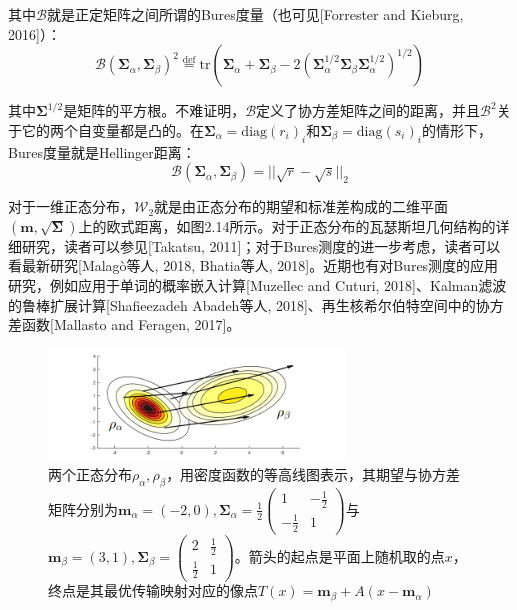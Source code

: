 \documentclass[cn,10pt,math=newtx,citestyle=gb7714-2015,bibstyle=gb7714-2015]{elegantbook}
\begin{document}
\begin{postulate}[正态分布的距离]
其中$\mathcal{B}$就是正定矩阵之间所谓的Bures度量（也可见[Forrester and Kieburg, 2016]）：
\begin{equation}
    \label{2.42}
    \mathcal{B}(\mathbf{\Sigma}_\alpha,\mathbf{\Sigma}_\beta)^2 \overset{\text{def}}{=} \text{tr} \left( \mathbf{\Sigma}_\alpha + \mathbf{\Sigma}_\beta - 2(\mathbf{\Sigma}_\alpha^{1/2}\mathbf{\Sigma}_\beta\mathbf{\Sigma}_\alpha^{1/2})^{1/2} \right)
\end{equation}

其中$\mathbf{\Sigma}^{1/2}$是矩阵的平方根。不难证明，$\mathcal{B}$定义了协方差矩阵之间的距离，并且$\mathcal{B}^2$关于它的两个自变量都是凸的。在$\mathbf{\Sigma}_\alpha=\text{diag}(r_i)_i$和$\mathbf{\Sigma}_\beta=\text{diag}(s_i)_i$的情形下，Bures度量就是Hellinger距离：
\begin{equation*}
    \mathcal{B}(\mathbf{\Sigma}_\alpha,\mathbf{\Sigma}_\beta)=||\sqrt{r}-\sqrt{s}||_2
\end{equation*}

对于一维正态分布，$\mathcal{W}_2$就是由正态分布的期望和标准差构成的二维平面$(\mathbf{m},\sqrt{\mathbf{\Sigma}})$上的欧式距离，如图2.14所示。对于正态分布的瓦瑟斯坦几何结构的详细研究，读者可以参见[Takatsu, 2011]；对于Bures测度的进一步考虑，读者可以看最新研究[Malag\`o等人, 2018, Bhatia等人, 2018]。近期也有对Bures测度的应用研究，例如应用于单词的概率嵌入计算[Muzellec and Cuturi, 2018]、Kalman滤波的鲁棒扩展计算[Shafieezadeh Abadeh等人, 2018]、再生核希尔伯特空间中的协方差函数[Mallasto and Feragen, 2017]。
\end{postulate}

\begin{figure}[H]
    \centering
    \includegraphics[width=0.7\textwidth]{figure/fig2.12.png}
    \caption{两个正态分布$\rho_\alpha,\rho_\beta$，用密度函数的等高线图表示，其期望与协方差矩阵分别为$\mathbf{m}_\alpha=(-2,0),\mathbf{\Sigma}_\alpha=\frac{1}{2}\begin{pmatrix}1 & -\frac{1}{2}\\-\frac{1}{2} & 1\end{pmatrix}$与$\mathbf{m}_\beta=(3,1),\mathbf{\Sigma}_\beta=\begin{pmatrix}2 & \frac{1}{2}\\\frac{1}{2} & 1\end{pmatrix}$。箭头的起点是平面上随机取的点$x$，终点是其最优传输映射对应的像点$T(x)=\mathbf{m}_\beta+A(x-\mathbf{m}_\alpha)$}
    \label{图2.12}
\end{figure}
\end{document}
